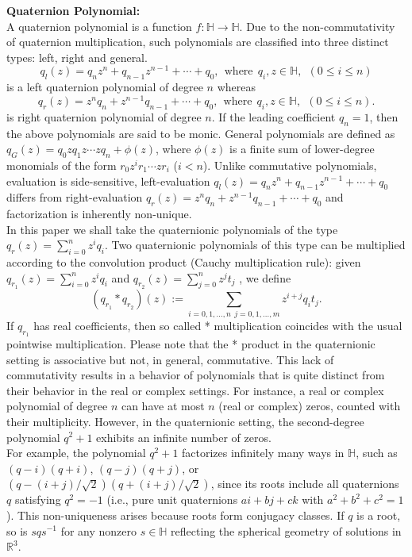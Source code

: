\documentclass [12pt]{article}
\begin{document}
\noindent\textbf{Quaternion Polynomial:}\\
A quaternion polynomial is a function \(f: \mathbb{H} \to \mathbb{H}\). Due to the non-commutativity of quaternion multiplication, such polynomials are classified into three distinct types: left, right and general.\\  
 $$q_l(z) = q_n z^n + q_{n-1} z^{n-1} + \cdots + q_0,~ ~\mbox{where} ~~ q_{i}, z \in\mathbb{H},~~ (0 \le i \le n)$$ is a left quaternion polynomial of degree $n$ whereas
 $$q_r(z) = z^n q_n + z^{n-1} q_{n-1} + \cdots + q_0 , 
~~\mbox{where}~~ q_{i}, z \in\mathbb{H},~~ (0 \le i \le n).$$ is right quaternion polynomial of degree $n.$ If the leading coefficient $q_{n}=1$, then the above polynomials are said to be monic. General polynomials are defined as \(q_G(z) = q_0 z q_1 z \cdots z q_n + \phi(z)\), where \(\phi(z)\) is a finite sum of lower-degree monomials of the form \(r_0 z^i r_1 \cdots z r_i\) (\(i < n\)). Unlike commutative polynomials, evaluation is side-sensitive, left-evaluation $q_l(z) = q_n z^n + q_{n-1} z^{n-1} + \cdots + q_0$ differs from right-evaluation $q_r(z) = z^n q_n + z^{n-1} q_{n-1} + \cdots + q_0 $ and factorization is inherently non-unique.\\ 
 \indent In this paper we shall take the quaternionic polynomials of the type $q_{r}(z)=\sum_{i=0}^{n}z^iq_i$. Two quaternionic polynomials of this type can be multiplied according to the convolution product (Cauchy multiplication rule): given $q_{r_{1}}(z)=\sum_{i=0}^{n}z^iq_i$ and $q_{r_{2}}(z)=\sum_{j=0}^{n}z^jt_j$ , we define
$$(q_{r_{1}}*q_{r_{2}})(z):=\sum_{i=0,1,\dots, n~~j=0,1,\dots,m}^{}z^{i+j}q_it_j.$$
If $q_{r_{1}}$ has real coefficients, then so called * multiplication coincides with the usual pointwise multiplication.
Please note that the * product in the quaternionic setting is associative but not, in general, commutative. This lack of commutativity results in a behavior of polynomials that is quite distinct from their behavior in the real or complex settings. For instance, a real or complex polynomial of degree $n$ can have at most $n$ (real or complex) zeros, counted with their multiplicity. However, in the quaternionic setting, the second-degree polynomial $q^2+1$ exhibits an infinite number of zeros.\\
For example, the polynomial \( q^2 + 1 \) factorizes infinitely many ways in $\mathbb{H}$, such as \( (q - i)(q + i) \), \( (q - j)(q + j) \), or \( (q - (i+j)/\sqrt{2})(q + (i+j)/\sqrt{2}) \), since its roots include all quaternions \( q \) satisfying \( q^2 = -1 \) (i.e., pure unit quaternions \( ai + bj + ck \) with \( a^2 + b^2 + c^2 = 1 \)). This non-uniqueness arises because roots form conjugacy classes. If \( q \) is a root, so is \( sqs^{-1} \) for any nonzero \( s \in \mathbb{H} \) reflecting the spherical geometry of solutions in \( \mathbb{R}^3 \).
\end{document}
